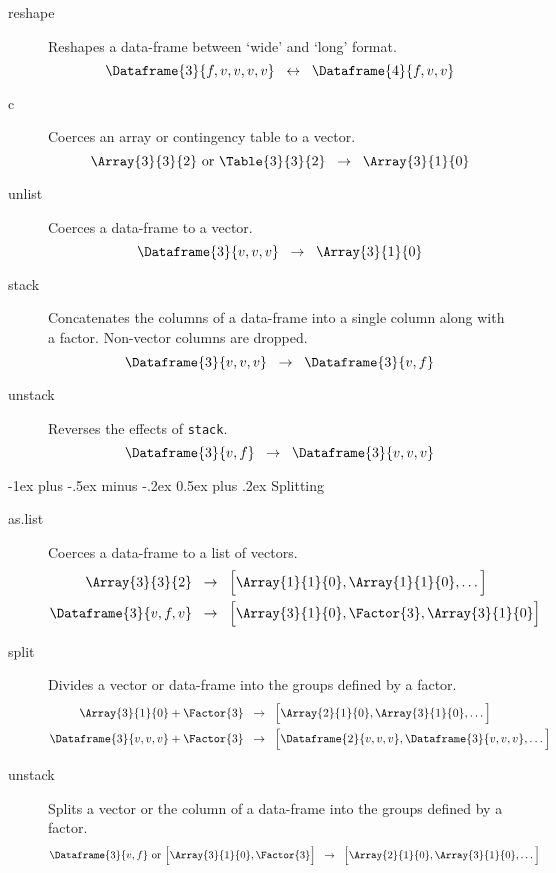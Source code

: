 \documentclass[a4paper,landscape]{article}
\makeatletter
\renewcommand{\section}{\@startsection{section}{1}{0mm}%
                                {-1ex plus -.5ex minus -.2ex}%
                                {0.5ex plus .2ex}%
                                {\normalfont\large\bfseries}}
\newcommand{\Maps}{\;\;\rightarrow \;\;}
\newcommand{\Switches}{\;\;\leftrightarrow \;\;}
\makeatother
\begin{document}
\begin{multicols*}{3}
\begin{description}
\item[reshape] Reshapes a data-frame between `wide' and `long' format.
\[
  \Dataframe{3}{f,v,v,v,v} \Switches \Dataframe{4}{f,v,v}
\]

\item[c] Coerces an array or contingency table to a vector.
\[
  \Array{3}{3}{2}\ \text{or}\ \Table{3}{3}{2} \Maps \Array{3}{1}{0}
\]

\item[unlist] Coerces a data-frame to a vector.
  \[ \Dataframe{3}{v,v,v} \Maps \Array{3}{1}{0} \]

\item[stack] Concatenates the columns of a data-frame into a single column
  along with a factor.  Non-vector columns are dropped.
  \[ \Dataframe{3}{v,v,v} \Maps \Dataframe{3}{v,f} \]

\item[unstack] Reverses the effects of \verb!stack!.
  \[ \Dataframe{3}{v,f} \Maps \Dataframe{3}{v,v,v} \]

\end{description}

\section{Splitting}

\begin{description}

\item[as.list] Coerces a data-frame to a list of vectors.
  \begin{align*}
    \Array{3}{3}{2} &\Maps \List{\Array{1}{1}{0},\Array{1}{1}{0},\dots} \\
    \Dataframe{3}{v,f,v}
    &\Maps \List{\Array{3}{1}{0},\Factor{3},\Array{3}{1}{0}}
  \end{align*}

\item[split] Divides a vector or data-frame into the groups defined by a
  factor.
  \begin{align*}
    \Array{3}{1}{0} + \Factor{3}
    &\Maps \List{\Array{2}{1}{0},\Array{3}{1}{0},\dots} \\
    \Dataframe{3}{v,v,v} + \Factor{3}
    &\Maps \List{\Dataframe{2}{v,v,v},\Dataframe{3}{v,v,v},\dots}
  \end{align*}

\item[unstack] Splits a vector or the column of a data-frame into the groups
  defined by a factor.
  \begin{align*}
    \Dataframe{3}{v,f}\ \text{or}\ \List{\Array{3}{1}{0},\Factor{3}}
    &\Maps \List{\Array{2}{1}{0},\Array{3}{1}{0},\dots}
  \end{align*}


\end{description}
\end{multicols*}
\end{document}
